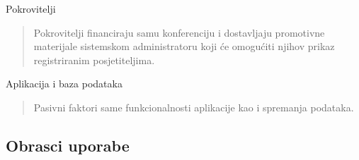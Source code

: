 \begin{packed_enum}
				\item Pokrovitelji
				\begin{quote}
					Pokrovitelji financiraju samu konferenciju i dostavljaju promotivne materijale sistemskom administratoru koji će omogućiti njihov prikaz registriranim posjetiteljima.
				\end{quote}
				
				
				\item Aplikacija i baza podataka
				\begin{quote}
					Pasivni faktori same funkcionalnosti aplikacije kao i spremanja podataka.
				\end{quote}
			\end{packed_enum}
			
			\eject 
			
			
				
			\subsection{Obrasci uporabe}
									
